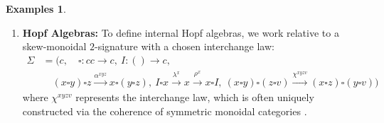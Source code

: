 \documentclass[11pt]{article}
\theoremstyle{plain}
\theoremstyle{definition}
\newtheorem{examples}[theorem]{Examples}
\numberwithin{equation}{section}
\begin{document}
\begin{examples}
\begin{enumerate}
   By definition, the category $M^T$ is the equifier of the parallel pair of natural transformations:
   \begin{align*}
   &\left(\overline{\mu \circ (\mu \square s)}_M, \,\, \overline{\rho_s}_M, \,\, \overline{\lambda_s}_M\right), \,\, \left(\overline{\mu \circ (s \square \mu) \circ \alpha_{s,s,s}}_M, \,\, \overline{\mu \circ (s \square u)}_M, \,\, \overline{\mu \circ (u \square s)}_M\right)\colon \\
   &\left(M((s \square s)\square s)U_M, \,\, M(s \square I)U_M, \,\, M(I \square s)U_M\right) \Rightarrow (U_M, \,\, U_M, \,\, U_M)\colon M^\sigma\to M_c^3
   \end{align*}
   This means an object $(x, m, e)$ of $M^\sigma$ is in $M^T$ if and only if 
   {\small
   $$
   \left(\overline{\mu \circ (\mu \square s)}_M, \,\, \overline{\rho_s}_M, \,\, \overline{\lambda_s}_M\right)_{(x,m,e)} = \left(\overline{\mu \circ (s \square \mu) \circ \alpha_{s,s,s}}_M, \,\, \overline{\mu \circ (s \square u)}_M, \,\, \overline{\mu \circ (u \square s)}_M\right)_{(x,m,e)},
   $$
   which is exactly to say that the following three equations hold in $M_c$:
   \begin{align*}
       m \circ (m \otimes x) &= m \circ (x \otimes m) \circ M(\alpha)_{x,x,x} \\
       m \circ (x \otimes e) &= M(\rho)_x \\
       m \circ (e \otimes x) &= M(\lambda)_x
   \end{align*}
   }
   These are precisely the classical associativity and unit laws for a monoid in $M$.

\item \textbf{Hopf Algebras:}
    To define internal Hopf algebras, we work relative to a skew-monoidal $2$-signature with a chosen interchange law:
    {\small
    \begin{align*}
        \Sigma&=(c, \quad \square \colon cc \to c,\ I \colon () \to c, \\
        &\quad (x \square y) \square z\xrightarrow{\alpha^{xyz}}  x \square (y \square z),\ I \square x \xrightarrow{\lambda^x} x \xrightarrow{\rho^x} x \square I,\ (x \square y) \square (z \square v) \xrightarrow{\chi^{xyzv}} (x \square z) \square (y \square v))
    \end{align*}
    }
    where $\chi^{xyzv}$ represents the interchange law, which is often uniquely constructed via the coherence of symmetric monoidal categories \cite{MacLane1998}.


\end{enumerate}
\end{examples}
\end{document}

